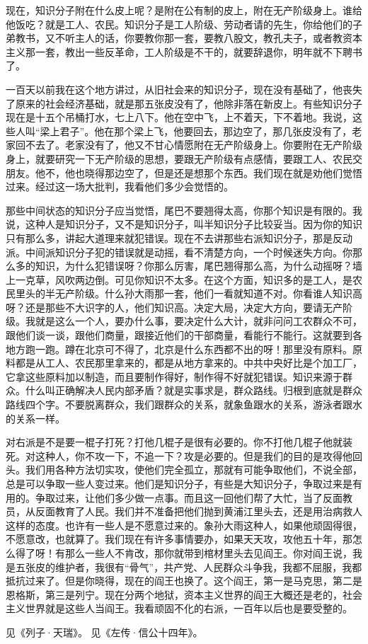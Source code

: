 现在，知识分子附在什么皮上呢？是附在公有制的皮上，附在无产阶级身上。谁给他饭吃？就是工人、农民。知识分子是工人阶级、劳动者请的先生，你给他们的子弟教书，又不听主人的话，你要教你那一套，要教八股文，教孔夫子，或者教资本主义那一套，教出一些反革命，工人阶级是不干的，就要辞退你，明年就不下聘书了。

一百天以前我在这个地方讲过，从旧社会来的知识分子，现在没有基础了，他丧失了原来的社会经济基础，就是那五张皮没有了，他除非落在新皮上。有些知识分子现在是十五个吊桶打水，七上八下。他在空中飞，上不着天，下不着地。我说，这些人叫“梁上君子”。他在那个梁上飞，他要回去，那边空了，那几张皮没有了，老家回不去了。老家没有了，他又不甘心情愿附在无产阶级身上。你要附在无产阶级身上，就要研究一下无产阶级的思想，要跟无产阶级有点感情，要跟工人、农民交朋友。他不，他也晓得那边空了，但是还是想那个东西。我们现在就是劝他们觉悟过来。经过这一场大批判，我看他们多少会觉悟的。

那些中间状态的知识分子应当觉悟，尾巴不要翘得太高，你那个知识是有限的。我说，这种人是知识分子，又不是知识分子，叫半知识分子比较妥当。因为你的知识只有那么多，讲起大道理来就犯错误。现在不去讲那些右派知识分子，那是反动派。中间派知识分子犯的错误就是动摇，看不清楚方向，一个时候迷失方向。你那么多的知识，为什么犯错误呀？你那么厉害，尾巴翘得那么高，为什么动摇呀？墙上一克草，风吹两边倒。可见你知识不太多。在这个方面，知识多的是工人，是农民里头的半无产阶级。什么孙大雨那一套，他们一看就知道不对。你看谁人知识高呀？还是那些不大识字的人，他们知识高。决定大局，决定大方向，要请无产阶级。我就是这么一个人，要办什么事，要决定什么大计，就非问问工农群众不可，跟他们谈一谈，跟他们商量，跟接近他们的干部商量，看能行不能行。这就要到各地方跑一跑。蹲在北京可不得了，北京是什么东西都不出的呀！那里没有原料。原料都是从工人、农民那里拿来的，都是从地方拿来的。中共中央好比是个加工厂，它拿这些原料加以制造，而且要制作得好，制作得不好就犯错误。知识来源于群众。什么叫正确解决人民内部矛盾？就是实事求是，群众路线。归根到底就是群众路线四个字。不要脱离群众，我们跟群众的关系，就象鱼跟水的关系，游泳者跟水的关系一样。

对右派是不是要一棍子打死？打他几棍子是很有必要的。你不打他几棍子他就装死。对这种人，你不攻一下，不追一下？攻是必要的。但是我们的目的是攻得他回头。我们用各种方法切实攻，使他们完全孤立，那就有可能争取他们，不说全部，总是可以争取一些人变过来。他们是知识分子，有些是大知识分子，争取过来是有用的。争取过来，让他们多少做一点事。而且这一回他们帮了大忙，当了反面教员，从反面教育了人民。我们并不准备把他们抛到黄浦江里头去，还是用治病救人这样的态度。也许有一些人是不愿意过来的。象孙大雨这种人，如果他顽固得很，不愿意改，也就算了。我们现在有许多事情要办，如果天天攻，攻他五十年，那怎么得了呀！有那么一些人不肯改，那你就带到棺材里头去见阎王。你对阎王说，我是五张皮的维护者，我很有“骨气”，共产党、人民群众斗争我，我都不屈服，我都抵抗过来了。但是你晓得，现在的阎王也换了。这个阎王，第一是马克思，第二是恩格斯，第三是列宁。现在分两个地狱，资本主义世界的阎王大概还是老的，社会主义世界就是这些人当阎王。我看顽固不化的右派，一百年以后也是要受整的。


\begin{maonote}
见《列子·天瑞》。
见《左传·信公十四年》。
\end{maonote}
